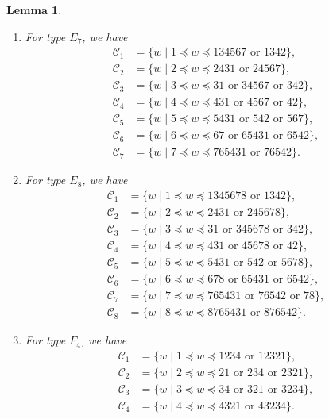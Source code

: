 \documentclass[11pt, reqno]{amsart}
\newcommand{\mb}{\mathbf}
\newtheorem{lem}[Thm]{Lemma}
\theoremstyle{definition}
\numberwithin{equation}{section}
\begin{document}
\begin{lem}
\begin{enumerate}
\item For type $E_{7}$, we have 
\begin{align*}
\mathcal{C}_1&=\{ w\mid 1\preceq w\preceq 134567 \text{ or }1342 \},\\
\mathcal{C}_2&=\{ w\mid 2\preceq w\preceq 2431 \text{ or }24567 \},\\
\mathcal{C}_3&=\{ w\mid 3\preceq w\preceq 31 \text{ or }34567 \text{ or }342  \},\\
\mathcal{C}_4&=\{ w\mid 4\preceq w\preceq 431 \text{ or }4567 \text{ or }42 \},\\
\mathcal{C}_5&=\{ w\mid 5\preceq w\preceq 5431 \text{ or }542 \text{ or }567 \},\\
\mathcal{C}_6&=\{ w\mid 6\preceq w\preceq 67 \text{ or } 65431 \text{ or }6542 \},\\
\mathcal{C}_7&=\{ w\mid 7\preceq w\preceq  765431 \text{ or }76542 \}.
\end{align*}

\item For type $E_{8}$, we have 
\begin{align*}
\mathcal{C}_1&=\{ w\mid 1\preceq w\preceq 1345678 \text{ or }1342 \},\\
\mathcal{C}_2&=\{ w\mid 2\preceq w\preceq 2431 \text{ or }245678 \},\\
\mathcal{C}_3&=\{ w\mid 3\preceq w\preceq 31 \text{ or }345678 \text{ or }342  \},\\
\mathcal{C}_4&=\{ w\mid 4\preceq w\preceq 431 \text{ or }45678 \text{ or }42 \},\\
\mathcal{C}_5&=\{ w\mid 5\preceq w\preceq 5431 \text{ or }542 \text{ or }5678 \},\\
\mathcal{C}_6&=\{ w\mid 6\preceq w\preceq 678 \text{ or } 65431 \text{ or }6542 \},\\
\mathcal{C}_7&=\{ w\mid 7\preceq w\preceq  765431 \text{ or }76542\text{ or }78 \},\\
\mathcal{C}_8&=\{ w\mid 8\preceq w\preceq  8765431 \text{ or }876542 \}.
\end{align*}
\item For type $F_{4}$, we have 
\begin{align*}
\mathcal{C}_1&=\{ w\mid 1\preceq w\preceq 1234 \text{ or }12321 \},\\
\mathcal{C}_2&=\{ w\mid 2\preceq w\preceq 21 \text{ or }234\text{ or }2321 \},\\
\mathcal{C}_3&=\{ w\mid 3\preceq w\preceq 34 \text{ or }321 \text{ or }3234  \},\\
\mathcal{C}_4&=\{ w\mid 4\preceq w\preceq 4321 \text{ or }43234 \}.
\end{align*}


\end{enumerate}
\end{lem}
\end{document}
